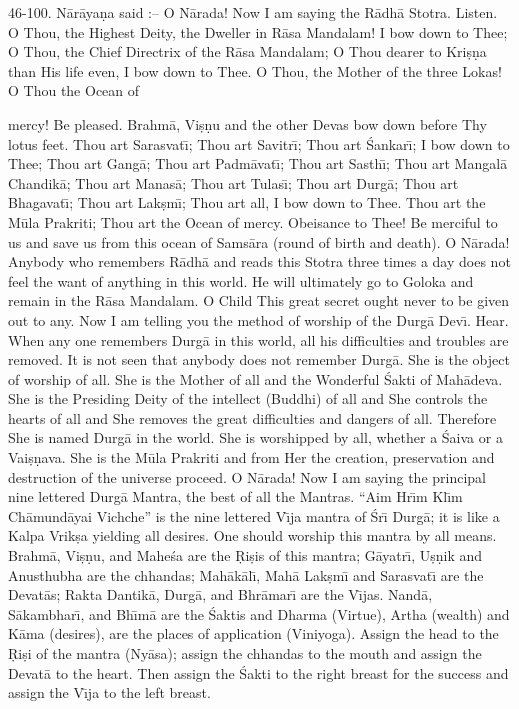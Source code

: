 46-100. N\=ar\=aya\d{n}a said :-- O N\=arada! Now I am saying the R\=adh\=a Stotra. Listen. O Thou, the Highest Deity, the Dweller in R\=asa Mandalam! I bow down to Thee; O Thou, the Chief Directrix of the R\=asa Mandalam; O Thou dearer to Kri\d{s}\d{n}a than His life even, I bow down to Thee. O Thou, the Mother of the three Lokas! O Thou the Ocean of

mercy! Be pleased. Brahm\=a, Vi\d{s}\d{n}u and the other Devas bow down before Thy lotus feet. Thou art Sarasvat\={\i}; Thou art Savitr\={\i}; Thou art \'Sankar\={\i}; I bow down to Thee; Thou art Gang\=a; Thou art Padm\=avat\={\i}; Thou art Sasth\={\i}; Thou art Mangal\=a Chandik\=a; Thou art Manas\=a; Thou art Tulas\={\i}; Thou art Durg\=a; Thou art Bhagavat\={\i}; Thou art Lak\d{s}m\={\i}; Thou art all, I bow down to Thee. Thou art the M\=ula Prakriti; Thou art the Ocean of mercy. Obeisance to Thee! Be merciful to us and save us from this ocean of Sams\=ara (round of birth and death). O N\=arada! Anybody who remembers R\=adh\=a and reads this Stotra three times a day does not feel the want of anything in this world. He will ultimately go to Goloka and remain in the R\=asa Mandalam. O Child This great secret ought never to be given out to any. Now I am telling you the method of worship of the Durg\=a Dev\={\i}. Hear. When any one remembers Durg\=a in this world, all his difficulties and troubles are removed. It is not seen that anybody does not remember Durg\=a. She is the object of worship of all. She is the Mother of all and the Wonderful \'Sakti of Mah\=adeva. She is the Presiding Deity of the intellect (Buddhi) of all and She controls the hearts of all and She removes the great difficulties and dangers of all. Therefore She is named Durg\=a in the world. She is worshipped by all, whether a \'Saiva or a Vai\d{s}\d{n}ava. She is the M\=ula Prakriti and from Her the creation, preservation and destruction of the universe proceed. O N\=arada! Now I am saying the principal nine lettered Durg\=a Mantra, the best of all the Mantras. ``Aim Hr\={\i}m Kl\={\i}m Ch\=amund\=ayai Vichche'' is the nine lettered V\={\i}ja mantra of \'Sr\={\i} Durg\=a; it is like a Kalpa Vrik\d{s}a yielding all desires. One should worship this mantra by all means. Brahm\=a, Vi\d{s}\d{n}u, and Mahe\'sa are the \d{R}i\d{s}is of this mantra; G\=ayatr\={\i}, U\d{s}\d{n}ik and Anusthubha are the chhandas; Mah\=ak\=al\={\i}, Mah\=a Lak\d{s}m\={\i} and Sarasvat\={\i} are the Devat\=as; Rakta Dantik\=a, Durg\=a, and Bhr\=amar\={\i} are the V\={\i}jas. Nand\=a, S\=akambhar\={\i}, and Bh\={\i}m\=a are the \'Saktis and Dharma (Virtue), Artha (wealth) and K\=ama (desires), are the places of application (Viniyoga). Assign the head to the \d{R}i\d{s}i of the mantra (Ny\=asa); assign the chhandas to the mouth and assign the Devat\=a to the heart. Then assign the \'Sakti to the right breast for the success and assign the V\={\i}ja to the left breast.

